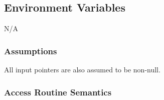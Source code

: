 \documentclass[12pt]{article}
\begin{document}
\subsection{Environment Variables}	\label{SecEVBody}
N/A
\subsubsection{Assumptions} \label{SecABody}
	All input pointers are also assumed to be non-null.

\subsubsection{Access Routine Semantics} \label{SecAPSBody}
\end{document}
